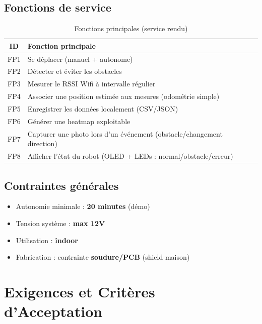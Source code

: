 \documentclass[a4paper,12pt]{report}
\begin{document}
\section{Fonctions de service}
\begin{table}[H]
\centering
{}
\begin{tabular}{|c|p{11cm}|}
\hline
\rowcolor{UTSlate}\color{white}\textbf{ID} & \color{white}\textbf{Fonction principale} \\ \hline
FP1 & Se déplacer (manuel + autonome) \\ \hline
FP2 & Détecter et éviter les obstacles \\ \hline
FP3 & Mesurer le RSSI Wifi à intervalle régulier \\ \hline
FP4 & Associer une position estimée aux mesures (odométrie simple) \\ \hline
FP5 & Enregistrer les données localement (CSV/JSON) \\ \hline
FP6 & Générer une heatmap exploitable \\ \hline
FP7 & Capturer une photo lors d’un événement (obstacle/changement direction) \\ \hline
FP8 & Afficher l’état du robot (OLED + LEDs : normal/obstacle/erreur) \\ \hline
\end{tabular}
\caption{Fonctions principales (service rendu)}
\end{table}

\section{Contraintes générales}
\begin{itemize}
    \item Autonomie minimale : \textbf{20 minutes} (démo)
    \item Tension système : \textbf{max 12V}
    \item Utilisation : \textbf{indoor}
    \item Fabrication : contrainte \textbf{soudure/PCB} (shield maison)
\end{itemize}

\chapter{Exigences et Critères d’Acceptation}
\end{document}

